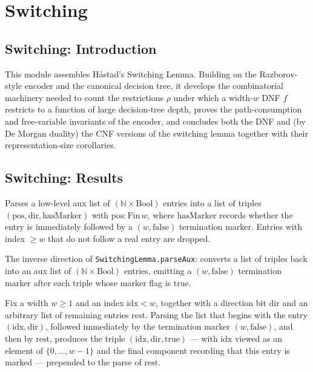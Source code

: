 \section{Switching}
\subsection*{Switching: Introduction}

This module assembles Håstad's Switching Lemma. Building on the Razborov-style
encoder and the canonical decision tree, it develops the combinatorial machinery
needed to count the restrictions $\rho$ under which a width-$w$ DNF $f$ restricts
to a function of large decision-tree depth, proves the path-consumption and
free-variable invariants of the encoder, and concludes both the DNF and (by De
Morgan duality) the CNF versions of the switching lemma together with their
representation-size corollaries.

\subsection*{Switching: Results}

\begin{definition}
\label{SwitchingLemma.parseAux}
\leanok
Parses a low-level aux list of $(\mathbb{N} \times \mathrm{Bool})$ entries into
a list of triples $(\mathrm{pos}, \mathrm{dir}, \mathrm{hasMarker})$ with
$\mathrm{pos} : \mathrm{Fin}\,w$, where $\mathrm{hasMarker}$ records whether the
entry is immediately followed by a $(w, \mathrm{false})$ termination marker.
Entries with index $\geq w$ that do not follow a real entry are dropped.
\end{definition}

\begin{definition}
\label{SwitchingLemma.triplesToAux}
\leanok
The inverse direction of \texttt{SwitchingLemma.parseAux}: converts a list of
triples back into an aux list of $(\mathbb{N} \times \mathrm{Bool})$ entries,
emitting a $(w, \mathrm{false})$ termination marker after each triple whose
marker flag is true.
\end{definition}

\begin{lemma}
\label{SwitchingLemma.parseAux_cons_marker}
\leanok
{}
Fix a width $w \ge 1$ and an index $\mathrm{idx} < w$, together with a direction bit
$\mathrm{dir}$ and an arbitrary list of remaining entries $\mathrm{rest}$. Parsing the
list that begins with the entry $(\mathrm{idx}, \mathrm{dir})$, followed immediately by
the termination marker $(w, \mathrm{false})$, and then by $\mathrm{rest}$, produces the
triple $(\mathrm{idx}, \mathrm{dir}, \mathrm{true})$ — with $\mathrm{idx}$ viewed as an
element of $\{0, \dots, w-1\}$ and the final component recording that this entry is
marked — prepended to the parse of $\mathrm{rest}$.
\end{lemma}


